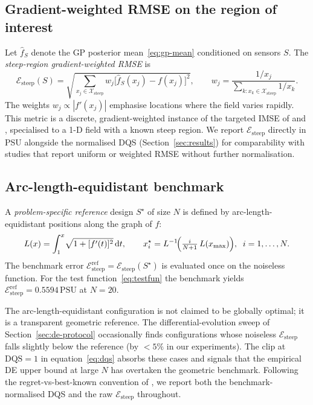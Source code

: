 \documentclass[11pt,letterpaper]{article}
\begin{document}
\subsection{Gradient-weighted RMSE on the region of interest}
\label{sec:steep-wrmse}
Let $\hat f_{S}$ denote the GP posterior mean~\eqref{eq:gp-mean}
conditioned on sensors $S$. The \emph{steep-region gradient-weighted
RMSE} is
\begin{equation}
\label{eq:steep-wrmse}
\mathcal{E}_{\text{steep}}(S)=
\sqrt{\sum_{x_{j}\in\mathcal{X}_{\text{steep}}}
      w_{j}\bigl[\hat f_{S}(x_{j})-f(x_{j})\bigr]^{2}},\qquad
w_{j}=\frac{1/x_{j}}{\sum_{k:x_{k}\in\mathcal{X}_{\text{steep}}}1/x_{k}}.
\end{equation}
The weights $w_{j}\propto|f'(x_{j})|$ emphasise locations where the
field varies rapidly. This metric is a discrete, gradient-weighted
instance of the targeted IMSE of \citet{picheny2010adaptive} and
\citet{bect2012sequential}, specialised to a 1-D field with a known
steep region. We report $\mathcal{E}_{\text{steep}}$ directly in PSU
alongside the normalised DQS (Section~\ref{sec:results}) for
comparability with studies that report uniform or weighted RMSE without
further normalisation.

\subsection{Arc-length-equidistant benchmark}
\label{sec:oracle}
A \emph{problem-specific reference} design $S^{\star}$ of size $N$ is
defined by arc-length-equidistant positions along the graph of $f$:
\begin{equation}
\label{eq:arclength}
L(x)=\int_{1}^{x}\!\sqrt{1+[f'(t)]^{2}}\,\mathrm{d}t,\qquad
x^{\star}_{i}=L^{-1}\!\Bigl(\tfrac{i}{N+1}\,L(x_{\max})\Bigr),\;\;
i=1,\dots,N.
\end{equation}
The benchmark error
$\mathcal{E}_{\text{steep}}^{\text{ref}}=
\mathcal{E}_{\text{steep}}(S^{\star})$ is evaluated once on the
noiseless function. For the test function~\eqref{eq:testfun} the
benchmark yields
$\mathcal{E}_{\text{steep}}^{\text{ref}}=0.5594\,\mathrm{PSU}$ at
$N=20$.

The arc-length-equidistant configuration is not claimed to be globally
optimal; it is a transparent geometric reference. The
differential-evolution sweep of Section~\ref{sec:de-protocol}
occasionally finds configurations whose noiseless
$\mathcal{E}_{\text{steep}}$ falls slightly below the reference (by
$<5\%$ in our experiments). The clip at $\mathrm{DQS}=1$ in
equation~\eqref{eq:dqs} absorbs these cases and signals that the
empirical DE upper bound at large $N$ has overtaken the geometric
benchmark. Following the regret-vs-best-known convention of
\citet{frazier2018tutorial}, we report both the benchmark-normalised
DQS and the raw $\mathcal{E}_{\text{steep}}$ throughout.
\end{document}
